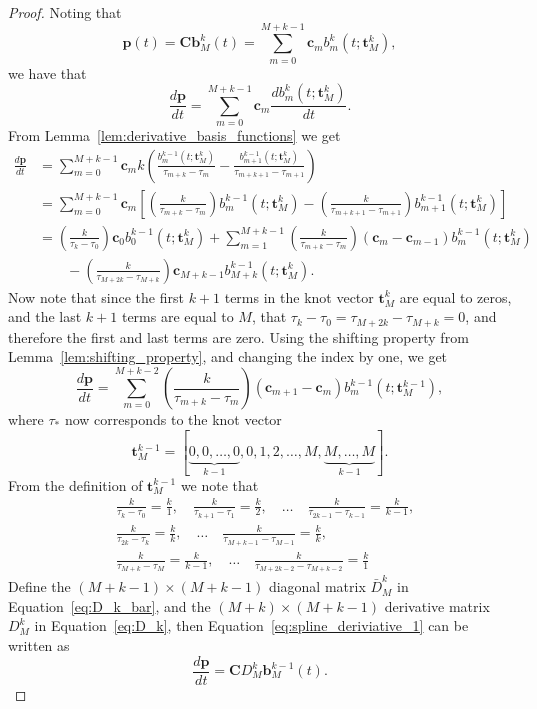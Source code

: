 \documentclass{article}
\newcommand{\bbf}{\mathbf{b}}
\newcommand{\cbf}{\mathbf{c}}
\newcommand{\Cbf}{\mathbf{C}}
\begin{document}
\begin{proof}
Noting that
\[
\mathbf{p}(t) = \Cbf \bbf_M^k(t)
              = \sum_{m=0}^{M+k-1} \cbf_m b_m^k(t; \mathbf{t}_M^k),
\]
we have that
\[
\frac{d\mathbf{p}}{dt} = \sum_{m=0}^{M+k-1} \cbf_m \frac{d b_m^k(t; \mathbf{t}_M^k)}{dt}.
\]
From Lemma~\ref{lem:derivative_basis_functions} we get
\begin{align*}
\frac{d\mathbf{p}}{dt} &= \sum_{m=0}^{M+k-1} \cbf_m k\left(\frac{b_m^{k-1}(t; \mathbf{t}_M^k)}{\tau_{m+k}-\tau_m} - \frac{b_{m+1}^{k-1}(t; \mathbf{t}_M^k)}{\tau_{m+k+1}-\tau_{m+1}} \right) \\
&= \sum_{m=0}^{M+k-1} \cbf_m \left[ \left(\frac{k}{\tau_{m+k}-\tau_m}\right) b_m^{k-1}(t; \mathbf{t}_M^k) - \left(\frac{k}{\tau_{m+k+1}-\tau_{m+1}}\right)  b_{m+1}^{k-1}(t; \mathbf{t}_M^k) \right] \\
&= \left(\frac{k}{\tau_{k}-\tau_0}\right)\cbf_0 b_0^{k-1}(t; \mathbf{t}_M^k) + \sum_{m=1}^{M+k-1} \left(\frac{k}{\tau_{m+k}-\tau_m}\right) \left(  \cbf_m - \cbf_{m-1}  \right) b_m^{k-1}(t; \mathbf{t}_M^k) \\
&\qquad - \left(\frac{k}{\tau_{M+2k}-\tau_{M+k}}\right)\cbf_{M+k-1}b_{M+k}^{k-1}(t; \mathbf{t}_M^k).
\end{align*}
Now note that since the first $k+1$ terms in the knot vector $\mathbf{t}_M^k$ are equal to zeros, and the last $k+1$ terms are equal to $M$, that $\tau_k-\tau_0 = \tau_{M+2k}-\tau_{M+k} = 0$, and therefore the first and last terms are zero.  Using the shifting property from Lemma~\ref{lem:shifting_property}, and changing the index by one, we get
\begin{equation}\label{eq:spline_deriviative_1}
\frac{d\mathbf{p}}{dt} = \sum_{m=0}^{M+k-2} \left(\frac{k}{\tau_{m+k}-\tau_{m}}\right) \left( \cbf_{m+1} - \cbf_{m}  \right) b_{m}^{k-1}(t; \mathbf{t}_M^{k-1}),
\end{equation}
where $\tau_\ast$ now corresponds to the knot vector 
\[
\mathbf{t}_M^{k-1} = [\underbrace{0, 0, \dots, 0}_{k-1}, 0, 1, 2, \dots, M, \underbrace{M, \dots, M}_{k-1}].
\]
From the definition of $\mathbf{t}_M^{k-1}$ we note that
\begin{align*}
& \frac{k}{\tau_{k}-\tau_0} = \frac{k}{1}, \quad
\frac{k}{\tau_{k+1}-\tau_1} = \frac{k}{2}, \quad
\dots \quad
\frac{k}{\tau_{2k-1}-\tau_{k-1}} = \frac{k}{k-1},  \\
&\frac{k}{\tau_{2k}-\tau_{k}} = \frac{k}{k}, \quad
\dots \quad
\frac{k}{\tau_{M+k-1} - \tau_{M-1}} = \frac{k}{k}, \\
& \frac{k}{\tau_{M+k} - \tau_{M}} = \frac{k}{k-1}, \quad
\dots \quad
\frac{k}{\tau_{M+2k-2} - \tau_{M+k-2}} = \frac{k}{1}
\end{align*}
Define the $(M+k-1)\times(M+k-1)$ diagonal matrix $\bar{D}_M^k$ in Equation~\eqref{eq:D_k_bar}, and the $(M+k)\times (M+k-1)$ derivative matrix $D_M^k$ in Equation~\eqref{eq:D_k},
then Equation~\eqref{eq:spline_deriviative_1} can be written as
\[
\frac{d\mathbf{p}}{dt} = \Cbf D_M^k \bbf_M^{k-1}(t).
\]
\end{proof}
\end{document}
